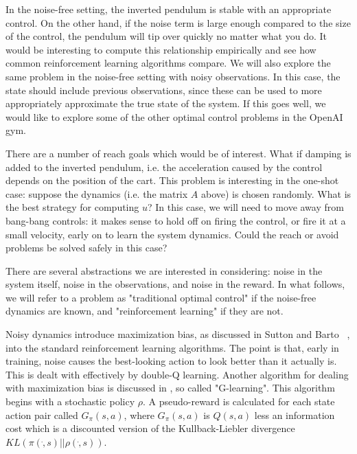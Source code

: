 \documentclass{article}
\begin{document}
In the noise-free setting, the inverted pendulum is stable with an appropriate control. On the other hand, if the noise term is large enough compared to the size of the control, the pendulum will tip over quickly no matter what you do. It would be interesting to compute this relationship empirically and see how common reinforcement learning algorithms compare.
We will also explore the same problem in the noise-free setting with noisy observations. In this case, the state should include previous observations, since these can be used to more appropriately approximate the true state of the system.
If this goes well, we would like to explore some of the other optimal control problems in the OpenAI gym.

There are a number of reach goals which would be of interest. What if damping is added to the inverted pendulum, i.e. the acceleration caused by the control depends on the position of the cart. This problem is interesting in the one-shot case: suppose the dynamics (i.e. the matrix $A$ above) is chosen randomly. What is the best strategy for computing $u$? In this case, we will need to move away from bang-bang controls: it makes sense to hold off on firing the control, or fire it at a small velocity, early on to learn the system dynamics. Could the reach or avoid problems be solved safely in this case?

There are several abstractions we are interested in considering: noise in the system itself, noise in the observations, and noise in the reward. In what follows, we will refer to a problem as "traditional optimal control" if the noise-free dynamics are known, and "reinforcement learning" if they are not. 

Noisy dynamics introduce maximization bias, as discussed in Sutton and Barto ~\cite{suttonAndBarto}, into the standard reinforcement learning algorithms. The point is that, early in training, noise causes the best-looking action to look better than it actually is. This is dealt with effectively by double-Q learning. Another algorithm for dealing with maximization bias is discussed in \cite{foxPakmanTishby}, so called "G-learning". This algorithm begins with a stochastic policy $\rho$. A pseudo-reward is calculated for each state action pair called $G_\pi(s,a)$, where $G_\pi(s,a)$ is $Q(s,a)$ less an information cost which is a discounted version of the Kullback-Liebler divergence $KL(\pi( \dot , s) || \rho( \dot , s))$.
\end{document}
